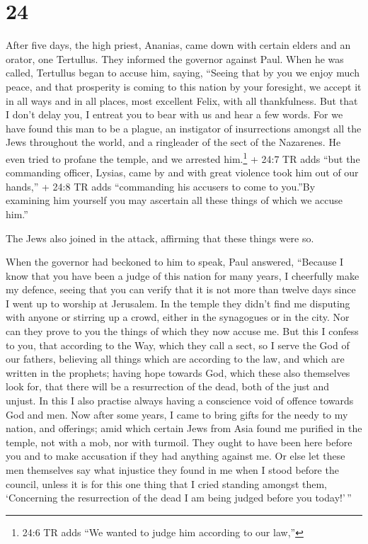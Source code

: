\hypertarget{section-23}{%
\section{24}\label{section-23}}

 After five days, the high priest, Ananias, came down with
certain elders and an orator, one Tertullus. They informed the governor
against Paul.  When he was called, Tertullus began to accuse
him, saying, ``Seeing that by you we enjoy much peace, and that
prosperity is coming to this nation by your foresight,  we
accept it in all ways and in all places, most excellent Felix, with all
thankfulness.  But that I don't delay you, I entreat you to
bear with us and hear a few words.  For we have found this
man to be a plague, an instigator of insurrections amongst all the Jews
throughout the world, and a ringleader of the sect of the Nazarenes.
 He even tried to profane the temple, and we arrested
him.\footnote{24:6 TR adds ``We wanted to judge him according to our
  law,''}  + 24:7 TR adds ``but the commanding officer,
Lysias, came by and with great violence took him out of our hands,''
 + 24:8 TR adds ``commanding his accusers to come to
you.''By examining him yourself you may ascertain all these things of
which we accuse him.''

 The Jews also joined in the attack, affirming that these
things were so.

 When the governor had beckoned to him to speak, Paul
answered, ``Because I know that you have been a judge of this nation for
many years, I cheerfully make my defence,  seeing that you
can verify that it is not more than twelve days since I went up to
worship at Jerusalem.  In the temple they didn't find me
disputing with anyone or stirring up a crowd, either in the synagogues
or in the city.  Nor can they prove to you the things of
which they now accuse me.  But this I confess to you, that
according to the Way, which they call a sect, so I serve the God of our
fathers, believing all things which are according to the law, and which
are written in the prophets;  having hope towards God,
which these also themselves look for, that there will be a resurrection
of the dead, both of the just and unjust.  In this I also
practise always having a conscience void of offence towards God and men.
 Now after some years, I came to bring gifts for the needy
to my nation, and offerings;  amid which certain Jews from
Asia found me purified in the temple, not with a mob, nor with turmoil.
 They ought to have been here before you and to make
accusation if they had anything against me.  Or else let
these men themselves say what injustice they found in me when I stood
before the council,  unless it is for this one thing that I
cried standing amongst them, `Concerning the resurrection of the dead I
am being judged before you today!'\,''

